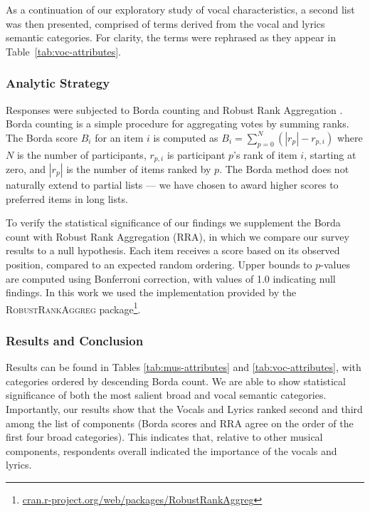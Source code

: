 \documentclass{article}
\begin{document}
As a continuation of our exploratory study of vocal characteristics, a second list was then presented, comprised of terms derived from the vocal and lyrics semantic categories.
For clarity, the terms were rephrased as they appear in Table~\ref{tab:voc-attributes}.

\subsubsection{Analytic Strategy}
Responses were subjected to Borda counting \cite{Borda1781} and Robust Rank Aggregation \cite{kolde2012robust}.
Borda counting is a simple procedure for aggregating votes by summing ranks.
The Borda score $B_i$ for an item $i$ is computed as
$B_i = \sum_{p=0}^N \left( |r_p| - r_{p, i} \right)$
where $N$ is the number of participants, $r_{p,i}$ is participant $p$'s rank of item $i$, starting at zero, and $|r_p|$ is the number of items ranked by $p$.
The Borda method does not naturally extend to partial lists\cite{dwork2001rank} --- we have chosen to award higher scores to preferred items in long lists.

To verify the statistical significance of our findings we supplement the Borda count with Robust Rank Aggregation (RRA), in which we compare our survey results to a null hypothesis.
Each item receives a score based on its observed position, compared to an expected random ordering.
Upper bounds to $p$-values are computed using Bonferroni correction, with values of 1.0 indicating null findings.
In this work we used the implementation provided by the \textsc{RobustRankAggreg} package\footnote{\url{cran.r-project.org/web/packages/RobustRankAggreg}}.

\subsubsection{Results and Conclusion}

Results can be found in Tables \ref{tab:mus-attributes} and \ref{tab:voc-attributes}, with categories ordered by descending Borda count.
We are able to show statistical significance of both the most salient broad and vocal semantic categories.
Importantly, our results show that the Vocals and Lyrics ranked second and third among the list of components (Borda scores and RRA agree on the order of the first four broad categories).
This indicates that, relative to other musical components, respondents overall indicated the importance of the vocals and lyrics.
\end{document}
